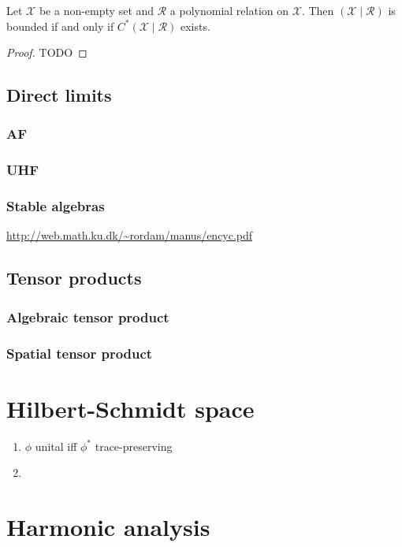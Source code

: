 \begin{proposition}
Let $\mathcal{X}$ be a non-empty set and $\mathcal{R}$ a polynomial relation on $\mathcal{X}$. Then $(\mathcal{X}\;|\; \mathcal{R})$ is bounded if and only if $C^*(\mathcal{X}\;|\;\mathcal{R})$ exists.
\end{proposition}
\begin{proof}
TODO
\end{proof}

\section{Direct limits}
\subsection{AF}
\subsection{UHF}
\subsection{Stable algebras}
\url{http://web.math.ku.dk/~rordam/manus/encyc.pdf}

\section{Tensor products}
\subsection{Algebraic tensor product}
\subsection{Spatial tensor product}

\chapter{Hilbert-Schmidt space}
\begin{proposition}
\begin{enumerate}
\item $\phi$ unital iff $\phi^*$ trace-preserving
\item
\end{enumerate}
\end{proposition}

\chapter{Harmonic analysis}
